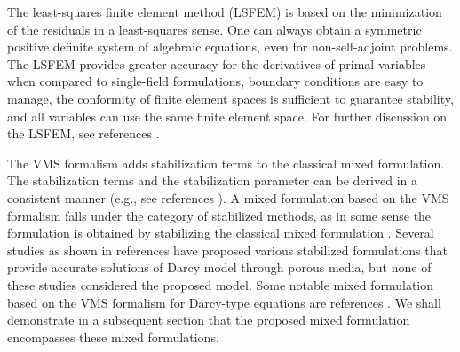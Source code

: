 \documentclass[11pt,reqno]{amsart}
\begin{document}
The least-squares finite element method (LSFEM) is 
based on the minimization of the residuals in a 
least-squares sense. One can always obtain a 
symmetric positive definite system of algebraic 
equations, even for non-self-adjoint problems. 
The LSFEM provides greater accuracy for the 
derivatives of primal variables when compared 
to single-field formulations, boundary conditions 
are easy to manage, the conformity of finite 
element spaces is sufficient to guarantee 
stability, and all variables can use the same 
finite element space. For further discussion on the
LSFEM, see references \cite{Bochev_Gunzburger_FEMLS,
Jiang_LSFEM}. 

The VMS formalism adds stabilization 
terms to the classical mixed formulation. The stabilization 
terms and the stabilization parameter can be derived in a 
consistent manner (e.g., see references 
\cite{Hughes_CMAME_1995_v127_p387,
Nakshatrala_Turner_Hjelmstad_Masud_CMAME_2006_v195_p4036}). 
A mixed formulation based on the VMS formalism falls under 
the category of stabilized methods, as in some sense the 
formulation is obtained by stabilizing the classical mixed 
formulation \cite{Donea_Huerta}. 
Several studies as shown in references 
\cite{KA_Mardal_Robust,Masud_IJNMF_2007_v54_p665,
VariationalHighPorous,MR_Correa_Velocity, Urquiza}
have proposed various stabilized formulations that 
provide accurate solutions of Darcy model through 
porous media, but none of these studies considered 
the proposed model. 
Some notable mixed formulation based on the VMS formalism 
for Darcy-type equations are references 
\cite{Masud_Hughes_CMAME_2002_v191_p4341,
Nakshatrala_Turner_Hjelmstad_Masud_CMAME_2006_v195_p4036,
Nakshatrala_Rajagopal_IJNMF_2011_v67_p342,
Nakshatrala_Turner_2013_arXiv}. We shall demonstrate in 
a subsequent section that the proposed mixed 
formulation encompasses these mixed formulations. 
\end{document}
